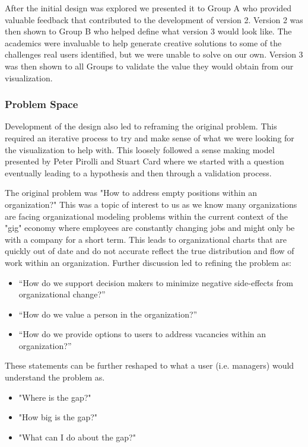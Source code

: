 \documentclass[journal]{vgtc}                %
\begin{document}
After the initial design was explored we presented it to Group A who provided valuable feedback that contributed to the development of version 2.  Version 2 was then shown to Group B who helped define what version 3 would look like.  The academics were invaluable to help generate creative solutions to some of the challenges real users identified, but we were unable to solve on our own.  Version 3 was then shown to all Groups to validate the value they would obtain from our visualization.

\subsubsection{Problem Space}
Development of the design also led to reframing the original problem.  This required an iterative process to try and make sense of what we were looking for the visualization to help with.  This loosely followed a sense making model presented by Peter Pirolli and Stuart Card\cite{cognativetaskanalysis} where we started with a question eventually leading to a hypothesis and then through a validation process.  

The original problem was "How to address empty positions within an organization?"  This was a topic of interest to us as we know many organizations are facing organizational modeling problems within the current context of the "gig" economy where employees are constantly changing jobs and might only be with a company for a short term.  This leads to organizational charts that are quickly out of date and do not accurate reflect the true distribution and flow of work within an organization.  
Further discussion led to refining the problem as:
\begin{itemize}
\item “How do we support decision makers to minimize negative side-effects from organizational change?”
\item “How do we value a person in the organization?”
\item “How do we provide options to users to address vacancies within an organization?”
\end{itemize}
These statements can be further reshaped to what a user (i.e. managers) would understand the problem as.
\begin{itemize}
\item "Where is the gap?"
\item "How big is the gap?"
\item "What can I do about the gap?"
\end{itemize}
\end{document}
